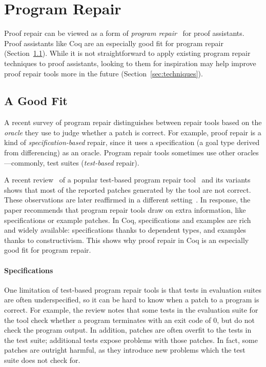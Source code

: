 \section{Program Repair}
\label{sec:repair}

Proof repair can be viewed as a form of \textit{program repair}~\cite{Monperrus:2018:ASR:3177787.3105906, Gazzola:2018:ASR:3180155.3182526}
for proof assistants. %
Proof assistants like Coq are an especially good fit for program repair (Section~\ref{sec:lessons}).
While it is not straightforward to apply existing program repair techniques to proof assistants,
looking to them for inspiration may help improve proof repair tools more in the future (Section~\ref{sec:techniques}).

\subsection{A Good Fit}
\label{sec:lessons}

A recent survey of program repair distinguishes between repair tools based on the \textit{oracle} they use to
judge whether a patch is correct.
For example, proof repair is a kind of \textit{specification-based} repair,
since it uses a specification (a goal type derived from differencing) as an oracle.
Program repair tools sometimes use other oracles---commonly, test suites (\textit{test-based} repair).

A recent review~\cite{Qi:2015:APP:2771783.2771791} of a popular test-based program repair tool~\cite{LeGoues:2012:SSA:2337223.2337225} and its variants
shows that most of the reported patches generated by the tool are not correct.
These observations are later reaffirmed in a different setting~\cite{DBLP:journals/corr/abs-1811-02429}.
In response, the paper recommends that program repair tools draw on extra information, like specifications or example patches.
In Coq, specifications and examples are rich and widely available: specifications thanks to dependent types,
and examples thanks to constructivism. This shows why proof repair in Coq is an especially good fit for program repair.
 
\paragraph{Specifications}
One limitation of test-based program repair tools is that tests in evaluation suites are often underspecified,
so it can be hard to know when a patch to a program is correct.
For example, the review notes that some tests in the evaluation suite for the tool check whether a program terminates with an exit code of 0, 
but do not check the program output.
In addition, patches are often overfit to the tests in the test suite; additional tests expose problems with those patches.
In fact, some patches are outright harmful, as they introduce new problems which the test suite does not check for.

